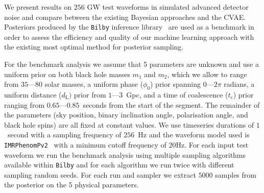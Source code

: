 \documentclass[%
showpacs,
 amsmath,amssymb,
 aps,
 twocolumn,
 prl,
 reprint,
floatfix,
]{revtex4-1}
\newcommand{\chris}[1]{\textbf{\textcolor{red}{CHRIS: #1}}}
\begin{document}
%
%
%
%
We present results on $256$ \ac{GW} test waveforms in simulated advanced detector noise and compare
between the existing Bayesian approaches and the \ac{CVAE}. Posteriors produced
by the \texttt{Bilby} inference library~\cite{1811.02042} are used as a
benchmark in order to assess the efficiency and quality of our machine learning
approach with the existing most optimal method for posterior sampling.

%
%
For the benchmark analysis we assume that 5 parameters are unknown and use a
uniform prior on both black hole masses $m_1$ and $m_2$, which we allow to
range from $35$---$80$ solar masses, a uniform phase ($\phi_0$) prior spanning
$0$---$2\pi$ radians, a uniform distance ($d_{\text{L}})$ prior
from $1$---$3$~Gpc, and a time of
coalescence ($t_{\text{c}}$) prior ranging from
$0.65$---$0.85$~seconds from the
start of the segment. The remainder of the parameters (sky position, binary
inclination angle, polarisation angle, and black hole spins) are all fixed at
constant values. We use timeseries durations of $1$~second with a sampling
frequency of $256$~Hz and the waveform model used is
\texttt{IMRPhenomPv2}~\cite{1809.10113} with a minimum cutoff frequency of
20Hz. For each input test waveform we run the benchmark analysis using multiple
sampling algorithms available within \texttt{Bilby} and for each algorithm we
run twice with different sampling random seeds. For each run and sampler we
extract $5000$ samples from the posterior on the 5 physical parameters.  
\end{document}
